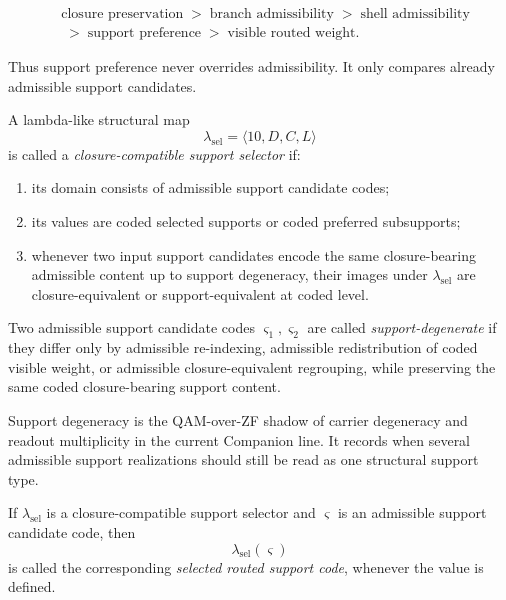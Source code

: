 \begin{definition}
\[
\begin{aligned}
&\text{closure preservation}
\;>\;
\text{branch admissibility}
\;>\;
\text{shell admissibility}\\[0.2em]
&\;>\;
\text{support preference}
\;>\;
\text{visible routed weight}.
\end{aligned}
\]
\end{definition}

\begin{remark}
Thus support preference never overrides admissibility. It only compares already admissible support candidates.
\end{remark}

\begin{definition}
A lambda-like structural map
\[
\lambda_{\mathrm{sel}}=\langle 10,D,C,L\rangle
\]
is called a \emph{closure-compatible support selector} if:
\begin{enumerate}
\item its domain consists of admissible support candidate codes;
\item its values are coded selected supports or coded preferred subsupports;
\item whenever two input support candidates encode the same closure-bearing admissible content up to support degeneracy, their images under $\lambda_{\mathrm{sel}}$ are closure-equivalent or support-equivalent at coded level.
\end{enumerate}
\end{definition}

\begin{definition}
Two admissible support candidate codes $\varsigma_1,\varsigma_2$ are called \emph{support-degenerate} if they differ only by admissible re-indexing, admissible redistribution of coded visible weight, or admissible closure-equivalent regrouping, while preserving the same coded closure-bearing support content.
\end{definition}

\begin{remark}
Support degeneracy is the QAM-over-ZF shadow of carrier degeneracy and readout multiplicity in the current Companion line. It records when several admissible support realizations should still be read as one structural support type.
\end{remark}

\begin{definition}
If $\lambda_{\mathrm{sel}}$ is a closure-compatible support selector and $\varsigma$ is an admissible support candidate code, then
\[
\lambda_{\mathrm{sel}}(\varsigma)
\]
is called the corresponding \emph{selected routed support code}, whenever the value is defined.
\end{definition}

